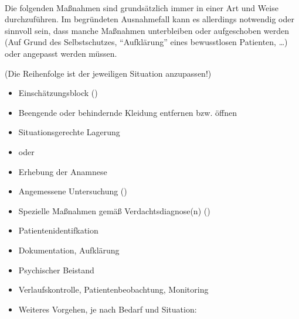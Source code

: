 ~

\label{apm}


{\label{m:standardmassnahmen-immer}}{%
Die folgenden Maßnahmen sind grundsätzlich immer in einer  Art und Weise durchzuführen. Im begründeten Ausnahmefall kann es
allerdings notwendig oder sinnvoll sein, dass manche Maßnahmen unterbleiben oder
aufgeschoben werden (Auf Grund des Selbstschutzes, \enquote{Aufklärung} eines bewusstlosen Patienten,
\ldots{}) oder angepasst werden müssen.

{\scriptsize (Die Reihenfolge ist der jeweiligen Situation anzupassen!)}
\begin{itemize}
  \item Einschätzungsblock ()
  \item Beengende oder behindernde Kleidung entfernen bzw.
  öffnen
  \item Situationsgerechte Lagerung
  \item {} oder 
  \item Erhebung der Anamnese 
  \item Angemessene Untersuchung ()
  \item Spezielle Maßnahmen gemäß Verdachtsdiagnose(n)
  ()
  \item Patientenidentifkation
  \item Dokumentation, Aufklärung
  \item Psychischer Beistand
  \item Verlaufskontrolle, Patientenbeobachtung, Monitoring
  \item Weiteres Vorgehen, je nach Bedarf und Situation:
  
  
 

\end{itemize}}
